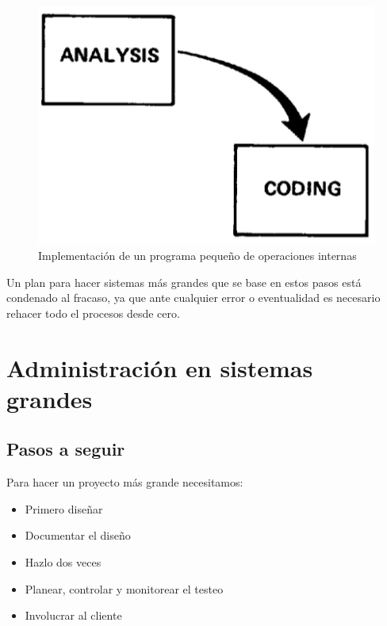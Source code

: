 \documentclass{beamer}
\begin{document}
\begin{frame}[fragile]

\begin{figure}[h]
\includegraphics[width=.3\textwidth]{figures/small.png}

\caption{Implementación de un programa pequeño de operaciones internas}
{}
\end{figure}

\vspace{-1em}

Un plan para hacer sistemas más grandes que se base en estos pasos está condenado al fracaso, ya que ante cualquier error o eventualidad es necesario rehacer todo el procesos desde cero.


\end{frame}

\section{Administración en sistemas grandes}

\subsection{Pasos a seguir}
\begin{frame}
Para hacer un proyecto más grande necesitamos:

\begin{itemize}
\item Primero diseñar %
\item Documentar el diseño %
\item Hazlo dos veces %
\item Planear, controlar y monitorear el testeo %
\item Involucrar al cliente %
\end{itemize}

\end{frame}
\end{document}
